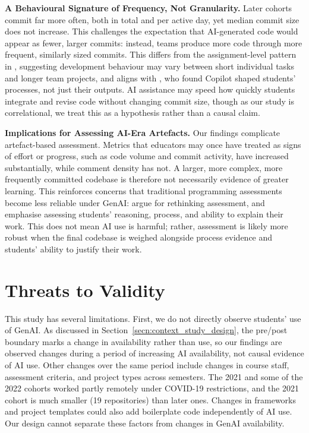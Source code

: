 \documentclass[sigconf,authorversion]{acmart}
\begin{document}
\textbf{A Behavioural Signature of Frequency, Not Granularity.}
Later cohorts commit far more often, both in total and per active day, yet median commit size does not increase. This challenges the expectation that AI-generated code would appear as fewer, larger commits: instead, teams produce more code through more frequent, similarly sized commits. This differs from the assignment-level pattern in \citet{zhang2026changes}, suggesting development behaviour may vary between short individual tasks and longer team projects, and aligns with \citet{shihab2025effects}, who found Copilot shaped students' processes, not just their outputs. AI assistance may speed how quickly students integrate and revise code without changing commit size, though as our study is correlational, we treat this as a hypothesis rather than a causal claim.

\textbf{Implications for Assessing AI-Era Artefacts.}
Our findings complicate artefact-based assessment. Metrics that educators may once have treated as signs of effort or progress, such as code volume and commit activity, have increased substantially, while comment density has not. A larger, more complex, more frequently committed codebase is therefore not necessarily evidence of greater learning. This reinforces concerns that traditional programming assessments become less reliable under GenAI: \citet{prather2023robots} argue for rethinking assessment, and \citet{bouvier2025rest} emphasise assessing students' reasoning, process, and ability to explain their work. This does not mean AI use is harmful; rather, assessment is likely more robust when the final codebase is weighed alongside process evidence and students' ability to justify their work.

\section{Threats to Validity}
\label{sec:threats}
This study has several limitations. 
First, we do not directly observe students' use of GenAI. As discussed in Section~\ref{secn:context_study_design}, the pre/post boundary marks a change in availability rather than use, so our findings are observed changes during a period of increasing AI availability, not causal evidence of AI use.
Other changes over the same period include changes in course staff, assessment criteria, and project types across semesters. The 2021 and some of the 2022 cohorts worked partly remotely under COVID-19 restrictions, and the 2021 cohort is much smaller (19 repositories) than later ones. Changes in frameworks and project templates could also add boilerplate code independently of AI use. Our design cannot separate these factors from changes in GenAI availability.
\end{document}
